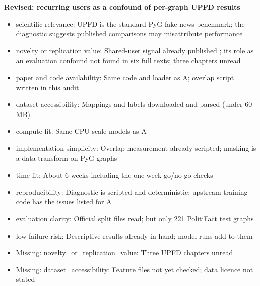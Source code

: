 \documentclass[11pt,a4paper]{article}
\begin{document}
\textbf{Revised: recurring users as a confound of per-graph UPFD results}
\begin{itemize}
\item scientific relevance: UPFD is the standard PyG fake-news benchmark; the diagnostic suggests published comparisons may misattribute performance \cite{karn2025structure,tuan2026review}
\item novelty or replication value: Shared-user signal already published \cite{jeong2022hgfnd}; its role as an evaluation confound not found in six full texts; three chapters unread
\item paper and code availability: Same code and loader as A; overlap script written in this audit
\item dataset accessibility: Mappings and labels downloaded and parsed (under 60 MB)
\item compute fit: Same CPU-scale models as A
\item implementation simplicity: Overlap measurement already scripted; masking is a data transform on PyG graphs
\item time fit: About 6 weeks including the one-week go/no-go checks
\item reproducibility: Diagnostic is scripted and deterministic; upstream training code has the issues listed for A
\item evaluation clarity: Official split files read; but only 221 PolitiFact test graphs
\item low failure risk: Descriptive results already in hand; model runs add to them
\item Missing: novelty\_or\_replication\_value: Three UPFD chapters unread
\item Missing: dataset\_accessibility: Feature files not yet checked; data licence not stated
\end{itemize}
\end{document}
